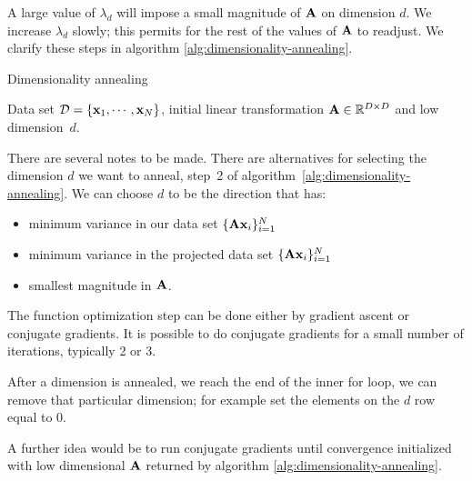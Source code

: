  A large value of $\lambda_d$ will impose a small magnitude of $\mathbf{A}$ on dimension $d$. We increase $\lambda_d$ slowly; this permits for the rest of the values of $\mathbf{A}$ to readjust. We clarify these steps in algorithm \ref{alg:dimensionality-annealing}.

  \begin{algorithm} 
	\caption{Dimensionality annealing} 
	\label{alg:dimensionality-annealing}  
	\begin{algorithmic} [1]                 %
		\REQUIRE Data set $\mathcal{D}=\{\mathbf{x}_1,\cdots,\mathbf{x}_N\}$, initial linear
transformation $\mathbf{A}\in\mathbb{R}^{D\times D}$ and low dimension~$d$.
		   \label{alg:dim-anneal-select-dim}
		  \ENDFOR
		\ENDFOR
	\end{algorithmic}
\end{algorithm}

  There are several notes to be made. There are alternatives for selecting the dimension $d$ we want to anneal, step~2 of algorithm~\ref{alg:dimensionality-annealing}. We can choose $d$ to be the direction that has:
    \begin{itemize}
     \item minimum variance in our data set $\{\mathbf{A}\mathbf{x}_i\}_{i=1}^N$
     \item minimum variance in the projected data set $\{\mathbf{A}\mathbf{x}_i\}_{i=1}^N$
     \item smallest magnitude in $\mathbf{A}$.
    \end{itemize}

    The function optimization step can be done either by gradient ascent or conjugate gradients. It is possible to do conjugate gradients for a small number of iterations, typically 2 or 3.

    After a dimension is annealed, we reach the end of the inner for loop, we can remove that particular dimension; for example set the elements on the $d$ row equal to 0.

    A further idea would be to run conjugate gradients until convergence initialized with low dimensional $\mathbf{A}$ returned by algorithm \ref{alg:dimensionality-annealing}.

